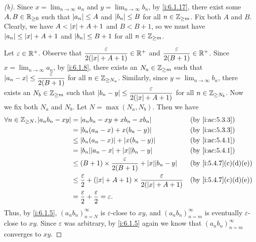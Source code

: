 \begin{proof}[(b)]
  Since \(x = \lim_{n \to \infty} a_n\) and \(y = \lim_{n \to \infty} b_n\), by \cref{i:6.1.17}, there exist some \(A, B \in \mathbb{R}_{\geq 0}\) such that \(\left\lvert a_n\right\rvert \leq A\) and \(\left\lvert b_n\right\rvert \leq B\) for all \(n \in \mathbb{Z}_{\geq m}\).
  Fix both \(A\) and \(B\).
  Clearly, we have \(A < \left\lvert x\right\rvert + A + 1\) and \(B < B + 1\), so we must have \(\left\lvert a_n\right\rvert \leq \left\lvert x\right\rvert + A + 1\) and \(\left\lvert b_n\right\rvert \leq B + 1\) for all \(n \in \mathbb{Z}_{\geq m}\).

  Let \(\varepsilon \in \mathbb{R}^+\).
  Observe that \(\dfrac{\varepsilon}{2 (\left\lvert x\right\rvert + A + 1)} \in \mathbb{R}^+\) and \(\dfrac{\varepsilon}{2 (B + 1)} \in \mathbb{R}^+\).
  Since \(x = \lim_{n \to \infty} a_n\), by \cref{i:6.1.8}, there exists an \(N_a \in \mathbb{Z}_{\geq m}\) such that \(\left\lvert a_n - x\right\rvert \leq \dfrac{\varepsilon}{2(B + 1)}\) for all \(n \in \mathbb{Z}_{\geq N_a}\).
  Similarly, since \(y = \lim_{n \to \infty} b_n\), there exists an \(N_b \in \mathbb{Z}_{\geq m}\) such that \(\left\lvert b_n - y\right\rvert \leq \dfrac{\varepsilon}{2 (\left\lvert x\right\rvert + A + 1)}\) for all \(n \in \mathbb{Z}_{\geq N_b}\).
  Now we fix both \(N_a\) and \(N_b\).
  Let \(N = \max(N_a, N_b)\).
  Then we have
  \begin{align*}
    \forall n \in \Z_{\geq N}, \abs{a_n b_n - x y} & = \abs{a_n b_n - x y + x b_n - x b_n}                                                           &  & \by{i:ac:5.3.3}     \\
                                                   & = \abs{b_n(a_n - x) + x(b_n - y)}                                                               &  & \by{i:ac:5.3.3}     \\
                                                   & \leq \abs{b_n(a_n - x)} + \abs{x(b_n - y)}                                                      &  & \by{i:ac:5.4.1}     \\
                                                   & = \abs{b_n}\abs{a_n - x} + \abs{x}\abs{b_n - y}                                                 &  & \by{i:ac:5.4.1}     \\
                                                   & \leq (B + 1) \times \dfrac{\varepsilon}{2 (B + 1)} + \abs{x}\abs{b_n - y}                       &  & \by{i:5.4.7}[c,d,e] \\
                                                   & \leq \dfrac{\varepsilon}{2} + (\abs{x} + A + 1) \times \dfrac{\varepsilon}{2 (\abs{x} + A + 1)} &  & \by{i:5.4.7}[c,d,e] \\
                                                   & = \dfrac{\varepsilon}{2} + \dfrac{\varepsilon}{2} = \varepsilon.
  \end{align*}
  Thus, by \cref{i:6.1.5}, \((a_n b_n)_{n = N}^\infty\) is \(\varepsilon\)-close to \(xy\), and \((a_n b_n)_{n = m}^\infty\) is eventually \(\varepsilon\)-close to \(xy\).
  Since \(\varepsilon\) was arbitrary, by \cref{i:6.1.5} again we know that \((a_n b_n)_{n = m}^\infty\) converges to \(xy\).
\end{proof}

